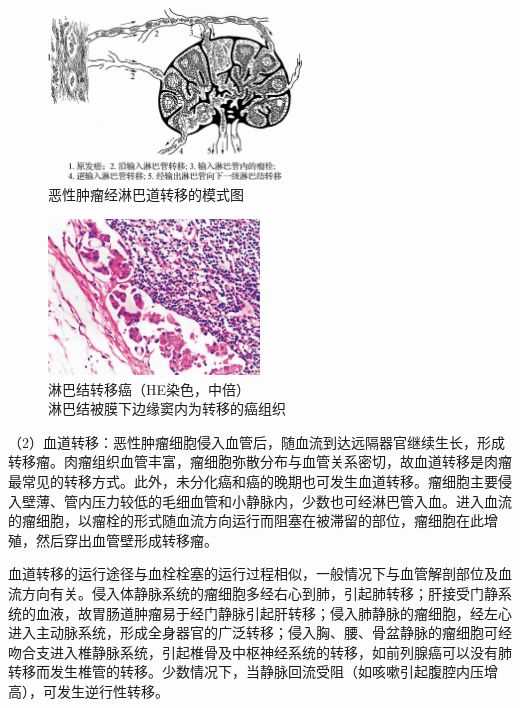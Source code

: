 \begin{figure}[!htbp]
 \centering
 \includegraphics[width=0.6\textwidth]{./images/Image00073.jpg}
 \caption{恶性肿瘤经淋巴道转移的模式图}
 \label{fig5-6}
  \end{figure}

\begin{figure}[!htbp]
 \centering
 \includegraphics[width=0.5\textwidth]{./images/Image00074.jpg}
 \caption{淋巴结转移癌（HE染色，中倍）\\ {\small 淋巴结被膜下边缘窦内为转移的癌组织}}
 \label{fig5-7}
  \end{figure}



（2）血道转移：恶性肿瘤细胞侵入血管后，随血流到达远隔器官继续生长，形成转移瘤。肉瘤组织血管丰富，瘤细胞弥散分布与血管关系密切，故血道转移是肉瘤最常见的转移方式。此外，未分化癌和癌的晚期也可发生血道转移。瘤细胞主要侵入壁薄、管内压力较低的毛细血管和小静脉内，少数也可经淋巴管入血。进入血流的瘤细胞，以瘤栓的形式随血流方向运行而阻塞在被滞留的部位，瘤细胞在此增殖，然后穿出血管壁形成转移瘤。

血道转移的运行途径与血栓栓塞的运行过程相似，一般情况下与血管解剖部位及血流方向有关。侵入体静脉系统的瘤细胞多经右心到肺，引起肺转移；肝接受门静系统的血液，故胃肠道肿瘤易于经门静脉引起肝转移；侵入肺静脉的瘤细胞，经左心进入主动脉系统，形成全身器官的广泛转移；侵入胸、腰、骨盆静脉的瘤细胞可经吻合支进入椎静脉系统，引起椎骨及中枢神经系统的转移，如前列腺癌可以没有肺转移而发生椎管的转移。少数情况下，当静脉回流受阻（如咳嗽引起腹腔内压增高），可发生逆行性转移。

